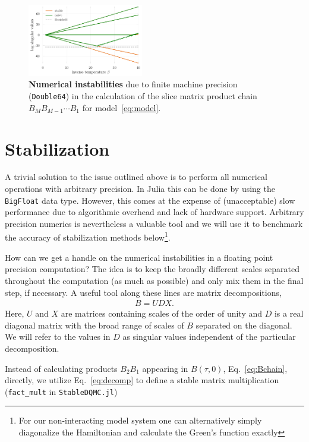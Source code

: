 \documentclass[%
 reprint,
superscriptaddress,
citeautoscript,
showpacs,
 amsmath,amssymb,
 aps,
 prb,
longbibliography,
]{revtex4-2}
\begin{document}
\begin{figure}[t]
	\includegraphics[width=0.45\textwidth]{figures/naive_vs_stable_db64.pdf}
	\caption{\textbf{Numerical instabilities} due to finite machine precision (\texttt{Double64}) in the calculation of the slice matrix product chain $B_M B_{M-1} \cdots B_1$ for model~\eqref{eq:model}. \label{fig:naive_vs_stable_db64}}
\end{figure}

\section{\label{sec:stabilization}Stabilization}

A trivial solution to the issue outlined above is to perform all numerical operations with arbitrary precision. In Julia this can be done by using the \texttt{BigFloat} data type. However, this comes at the expense of (unacceptable) slow performance due to algorithmic overhead and lack of hardware support. Arbitrary precision numerics is nevertheless a valuable tool and we will use it to benchmark the accuracy of stabilization methods below\footnote{For our non-interacting model system one can alternatively simply diagonalize the Hamiltonian and calculate the Green's function exactly}.

How can we get a handle on the numerical instabilities in a floating point precision computation? The idea is to keep the broadly different scales separated throughout the computation (as much as possible) and only mix them in the final step, if necessary. A useful tool along these lines are matrix decompositions,
\begin{align}
	B = UDX. \label{eq:decomp}
\end{align}
Here, $U$ and $X$ are matrices containing scales of the order of unity and $D$ is a real diagonal matrix with the broad range of scales of $B$ separated on the diagonal. We will refer to the values in $D$ as singular values independent of the particular decomposition.

Instead of calculating products $B_2 B_1$ appearing in $B(\tau, 0)$, Eq.~\ref{eq:Bchain}, directly, we utilize Eq.~\ref{eq:decomp} to define a stable matrix multiplication (\texttt{fact\_mult} in \texttt{StableDQMC.jl})
\end{document}
